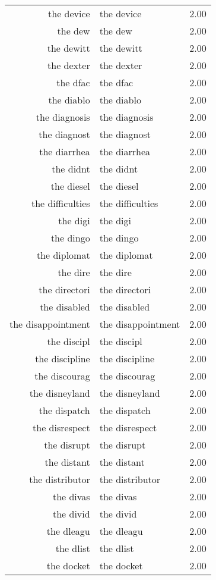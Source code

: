 \begin{table}[ht]
\begin{tabular}{rlr}
  the device & the device & 2.00 \\ 
  the dew & the dew & 2.00 \\ 
  the dewitt & the dewitt & 2.00 \\ 
  the dexter & the dexter & 2.00 \\ 
  the dfac & the dfac & 2.00 \\ 
  the diablo & the diablo & 2.00 \\ 
  the diagnosis & the diagnosis & 2.00 \\ 
  the diagnost & the diagnost & 2.00 \\ 
  the diarrhea & the diarrhea & 2.00 \\ 
  the didnt & the didnt & 2.00 \\ 
  the diesel & the diesel & 2.00 \\ 
  the difficulties & the difficulties & 2.00 \\ 
  the digi & the digi & 2.00 \\ 
  the dingo & the dingo & 2.00 \\ 
  the diplomat & the diplomat & 2.00 \\ 
  the dire & the dire & 2.00 \\ 
  the directori & the directori & 2.00 \\ 
  the disabled & the disabled & 2.00 \\ 
  the disappointment & the disappointment & 2.00 \\ 
  the discipl & the discipl & 2.00 \\ 
  the discipline & the discipline & 2.00 \\ 
  the discourag & the discourag & 2.00 \\ 
  the disneyland & the disneyland & 2.00 \\ 
  the dispatch & the dispatch & 2.00 \\ 
  the disrespect & the disrespect & 2.00 \\ 
  the disrupt & the disrupt & 2.00 \\ 
  the distant & the distant & 2.00 \\ 
  the distributor & the distributor & 2.00 \\ 
  the divas & the divas & 2.00 \\ 
  the divid & the divid & 2.00 \\ 
  the dleagu & the dleagu & 2.00 \\ 
  the dlist & the dlist & 2.00 \\ 
  the docket & the docket & 2.00 \\ 

\end{tabular}
\end{table}
